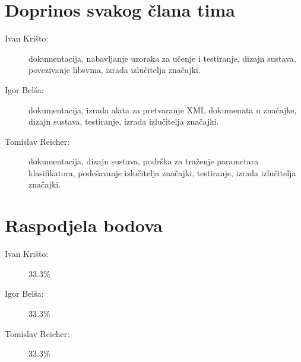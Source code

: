 \documentclass{article}
\begin{document}
\section{Doprinos svakog člana tima}
\begin{description}
\item[Ivan Krišto:] dokumentacija, nabavljanje uzoraka za učenje i testiranje,
dizajn sustava, povezivanje libsvma, izrada izlučitelja značajki.
\item[Igor Belša:] dokumentacija, izrada alata za pretvaranje XML dokumenata u
značajke, dizajn sustava, testiranje, izrada izlučitelja značajki.
\item[Tomislav Reicher:] dokumentacija, dizajn sustava, podrška za traženje
parametara klasifikatora, podešavanje izlučitelja značajki, testiranje, izrada
izlučitelja značajki.
\end{description}

\section{Raspodjela bodova}
\begin{description}
\item[Ivan Krišto:] 33.3\%
\item[Igor Belša:] 33.3\%
\item[Tomislav Reicher:] 33.3\%
\end{description}
\end{document}
